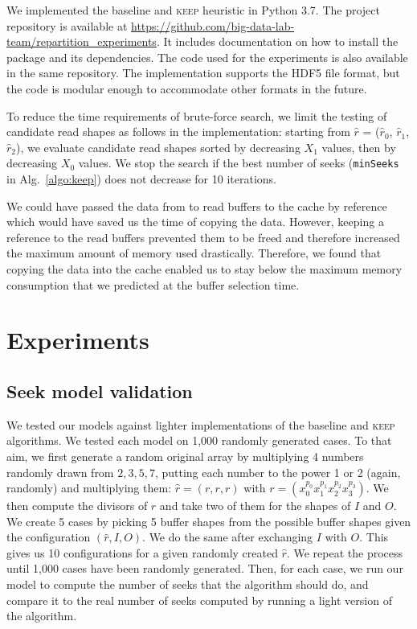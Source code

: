 \documentclass[sigconf, nonacm]{acmart}
\newcommand{\keep}[0]{\textsc{keep}\xspace}
\begin{document}
We implemented the baseline and \keep heuristic in Python 3.7. The
project repository is available at
\url{https://github.com/big-data-lab-team/repartition_experiments}. It includes documentation on
how to install the package and its dependencies. The code used for the
experiments is also available in the same repository.
The implementation supports the HDF5 file format, but the code is modular
enough to accommodate other formats in the future.

To reduce the time requirements of brute-force search, we limit the testing
of candidate read shapes as follows in the implementation: starting from
$\hat r$ = ($\hat r_0$, $\hat r_1$, $\hat r_2$), we evaluate candidate read
shapes sorted by decreasing $X_1$ values, then by decreasing $X_0$ values.
We stop the search if the best number of seeks (\texttt{minSeeks} in
Alg.~\ref{algo:keep}) does not decrease for 10 iterations.

We could have passed the data from to read buffers to the cache by reference
which would have saved us the time of copying the data.
However, keeping a reference to the read buffers prevented them to be freed and
therefore increased the maximum amount of memory used drastically.
Therefore, we found that copying the data into the cache enabled us to stay below the
maximum memory consumption that we predicted at the buffer selection time.

\section{Experiments}
\label{sec:experiments}
\subsection{Seek model validation}

We tested our models against lighter implementations of the baseline and \keep
algorithms. We tested each model on 1,000 randomly generated cases.
To that aim, we first generate a random original array by multiplying 4 numbers
randomly drawn from ${2, 3, 5, 7}$, putting each number to the power 1 or 2
(again, randomly) and multiplying them:
$\hat r = (r,r,r)$ with $r = (x_0^{p_0}x_1^{p_1}x_2^{p_2}x_3^{p_3})$.
We then compute the divisors of $r$ and take two of them for the shapes of $I$
and $O$. We create 5 cases by picking 5 buffer shapes from the possible buffer
shapes given the configuration $(\hat r, I, O)$. We do the same after exchanging
$I$ with $O$. This gives us 10 configurations for a given randomly created $\hat r$.
We repeat the process until 1,000 cases have been randomly generated.
Then, for each case, we run our model to compute the number of seeks that the algorithm
should do, and compare it to the real number of seeks computed by running a light version
of the algorithm.
\end{document}
